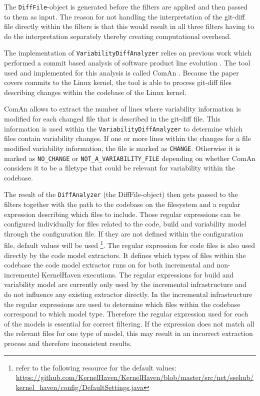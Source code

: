 \documentclass[a4paper]{article}
\begin{document}
The \texttt{DiffFile}-object is generated before the filters are applied and then passed to them as input. The reason for not handling the interpretation of the git-diff file directly within the filters is that this would result in all three filters having to do the interpretation separately thereby creating computational overhead.

The implementation of \texttt{VariabilityDiffAnalyzer} relies on previous work which performed a commit based analysis of software product line evolution \cite{ComAn}. The tool used and implemented for this analysis  is called ComAn \cite{ComAn-tool}. Because the paper covers commits to the Linux kernel, the tool is able to process git-diff files describing changes within the codebase of the Linux kernel. 

ComAn allows to extract the number of lines where variability information is modified for each changed file that is described in the git-diff file. This information is used within the \texttt{VariabilityDiffAnalyzer} to determine which files contain variability changes. If one or more lines within the changes for a file modified variability information, the file is marked as \texttt{CHANGE}. Otherwise it is marked as \texttt{NO\_CHANGE} or \texttt{NOT\_A\_VARIABILITY\_FILE} depending on whether ComAn considers it to be a filetype that could be relevant for variability within the codebase. 

The result of the \texttt{DiffAnalyzer} (the DiffFile-object) then gets passed to the filters together with the path to the codebase on the filesystem and a regular expression describing which files to include. Those regular expressions can be configured individually for files related to the code, build and variability model through the configuration file. If they are not defined within the configuration file, default values will be used \footnote{refer to the following resource  for the default values: \url{https://github.com/KernelHaven/KernelHaven/blob/master/src/net/ssehub/kernel_haven/config/DefaultSettings.java}}. The regular expression for code files is also used directly by the code model extractors. It defines which types of files within the codebase the code model extractor runs on for both incremental and non-incrementel KernelHaven executions. The regular expressions for build and variability model are currently only used by the incremental infrastructure and do not influence any existing extractor directly. In the incremental infrastructure the regular expressions are used to determine which files within the codebase correspond to which model type. Therefore the regular expression used for each of the models is essential for correct filtering. If the expression does not match all the relevant files for one type of model, this may result in an incorrect extraction process and therefore inconsistent results.
\end{document}
